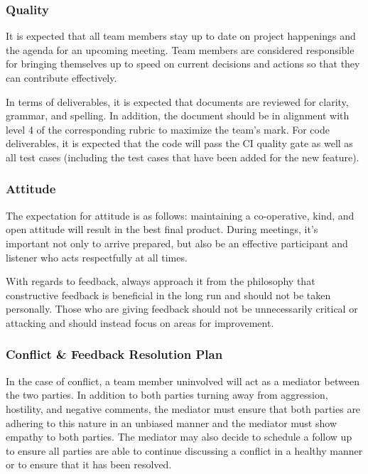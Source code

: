 \documentclass{article}
\begin{document}
\subsubsection*{Quality} 

It is expected that all team members stay up to date on project happenings and the agenda for an upcoming meeting. Team members are considered responsible for bringing themselves up to speed on current decisions and actions so that they can contribute effectively.

In terms of deliverables, it is expected that documents are reviewed for clarity, grammar, and spelling. In addition, the document should be in alignment with level 4 of the corresponding rubric to maximize the team's mark.
For code deliverables, it is expected that the code will pass the CI quality gate as well as all test cases (including the test cases that have been added for the new feature).

\subsubsection*{Attitude}

The expectation for attitude is as follows: maintaining a co-operative, kind, and open attitude will result in the best final product. During meetings, it's important not only to arrive prepared, but also
be an effective participant and listener who acts respectfully at all times.

With regards to feedback, always approach it from the philosophy that constructive feedback is beneficial in the long run and should not be taken personally. Those who are giving feedback should not be unnecessarily
critical or attacking and should instead focus on areas for improvement.

\subsubsection{Conflict \& Feedback Resolution Plan}

In the case of conflict, a team member uninvolved will act as a mediator between the two parties. 
In addition to both parties turning away from aggression, hostility, and negative comments, the mediator 
must ensure that both parties are adhering to this nature in an unbiased manner and the mediator must show empathy to both parties. 
The mediator may also decide to schedule a follow up to ensure all parties are able to continue discussing a conflict in a healthy 
manner or to ensure that it has been resolved.
\end{document}
